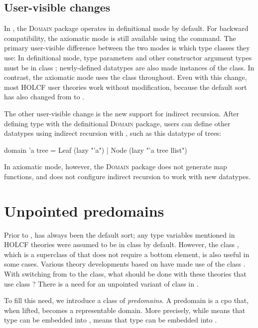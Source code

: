 \subsection{User-visible changes}

In , the \textsc{Domain} package operates in definitional mode by default. For backward compatibility, the axiomatic mode is still available using the   command. The primary user-visible difference between the two modes is which type classes they use: In definitional mode, type parameters and other constructor argument types must be in class ; newly-defined datatypes are also made instances of the  class. In contrast, the axiomatic mode uses the  class throughout. Even with this change, most HOLCF user theories work without modification, because the default sort has also changed from  to .

The other user-visible change is the new support for indirect recursion. After defining type  with the definitional \textsc{Domain} package, users can define other datatypes using indirect recursion with , such as this datatype of trees:
%
\begin{isacode}
domain 'a tree = Leaf (lazy "'a") | Node (lazy "'a tree llist")
\end{isacode}
%
In axiomatic mode, however, the \textsc{Domain} package does not generate map functions, and does not configure indirect recursion to work with new datatypes.

\section{Unpointed predomains}
\label{sec:universal-predomain}

Prior to ,  has always been the default sort; any type variables mentioned in HOLCF theories were assumed to be in class  by default. However, the class , which is a superclass of  that does not require a bottom element, is also useful in some cases. Various theory developments based on  have made use of the  class \cite{hol+lcf, mueller98thesis}. With  switching from  to the  class, what should be done with these theories that use class ? There is a need for an unpointed variant of class  in .

To fill this need, we introduce a class of \emph{predomains}. A predomain is a cpo that, when lifted, becomes a representable domain. More precisely, while  means that type  can be embedded into ,  means that type  can be embedded into .

